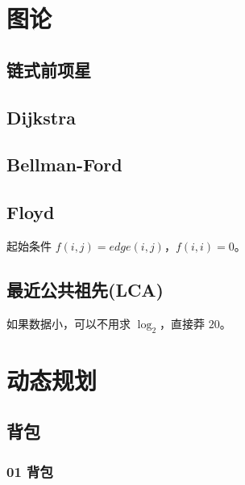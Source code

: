 \documentclass[cn,11pt,blue,normal,founder]{elegantbook}
\begin{document}


\chapter{图论}

\section{链式前项星}



\section{Dijkstra}



\section{Bellman-Ford}



\section{Floyd}

起始条件 $f(i,j)=edge(i,j)$，$f(i,i)=0$。



\section{最近公共祖先(LCA)}

如果数据小，可以不用求 $\log_2$，直接莽 $20$。




\chapter{动态规划}

\section{背包}

\subsection{01 背包}
\end{document}
